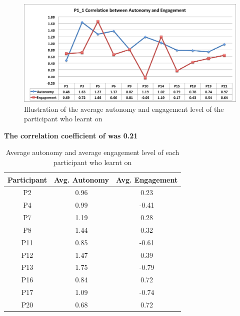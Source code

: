 \begin{figure}[H]
\centering
\includegraphics[width=1 \textwidth]{r13}
\caption{Illustration of the average autonomy and engagement level of the participant who learnt on  }
\end{figure}
\begin{addmargin}[7em]{3em}
\textbf{The correlation coefficient of  was 0.21}
\end{addmargin}
\newpage 
\begin{table}[H]
\centering
\caption{Average autonomy and average engagement level of each participant who learnt on }

\begin{tabular}{|c|c|c|} \hline
 Participant & Avg. Autonomy & Avg. Engagement \\
\hline
P2& 0.96  &0.23  \\
\hline 
P4& 0.99 & -0.41 \\
\hline
P7& 1.19  & 0.28 \\
\hline 
P8& 1.44  & 0.32  \\
\hline
P11&0.85  & -0.61 \\
\hline 
P12& 1.47 & 0.39  \\
\hline
P13& 1.75  & -0.79 \\
\hline 
P16& 0.84 & 0.72 \\
\hline
P17& 1.09 & -0.74 \\
\hline 
P20& 0.68 & 0.72 \\
\hline
\end{tabular}
\end{table}


